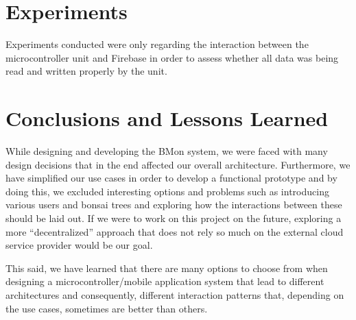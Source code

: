 \documentclass{article}
\begin{document}
\section{Experiments}\label{sec:experiments}
Experiments conducted were only regarding the interaction between the
microcontroller unit and Firebase in order to assess whether all data was being
read and written properly by the unit.


\section{Conclusions and Lessons Learned}\label{sec:conclusion}
While designing and developing the BMon system, we were faced with many design
decisions that in the end affected our overall architecture. Furthermore, we
have simplified our use cases in order to develop a functional prototype and by
doing this, we excluded interesting options and problems such as introducing
various users and bonsai trees and exploring how the interactions between these
should be laid out. If we were to work on this project on the future, exploring
a more ``decentralized'' approach that does not rely so much on the external
cloud service provider would be our goal.

This said, we have learned that there are many options to choose from when
designing a microcontroller/mobile application system that lead to different
architectures and consequently, different interaction patterns that, depending
on the use cases, sometimes are better than others.

\newpage


\end{document}
